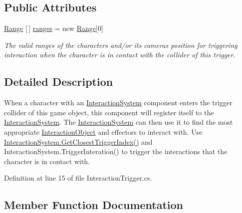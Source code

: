 \subsection*{Public Attributes}
\begin{DoxyCompactItemize}
\item 
\mbox{\hyperlink{class_root_motion_1_1_final_i_k_1_1_interaction_trigger_1_1_range}{Range}} \mbox{[}$\,$\mbox{]} \mbox{\hyperlink{class_root_motion_1_1_final_i_k_1_1_interaction_trigger_a13948fdb3d84a0bea1e15d1eb2ce019e}{ranges}} = new \mbox{\hyperlink{class_root_motion_1_1_final_i_k_1_1_interaction_trigger_1_1_range}{Range}}\mbox{[}0\mbox{]}
\begin{DoxyCompactList}\small\item\em The valid ranges of the character\textquotesingle{}s and/or it\textquotesingle{}s camera\textquotesingle{}s position for triggering interaction when the character is in contact with the collider of this trigger. \end{DoxyCompactList}\end{DoxyCompactItemize}


\subsection{Detailed Description}
When a character with an \mbox{\hyperlink{class_root_motion_1_1_final_i_k_1_1_interaction_system}{Interaction\+System}} component enters the trigger collider of this game object, this component will register itself to the \mbox{\hyperlink{class_root_motion_1_1_final_i_k_1_1_interaction_system}{Interaction\+System}}. The \mbox{\hyperlink{class_root_motion_1_1_final_i_k_1_1_interaction_system}{Interaction\+System}} can then use it to find the most appropriate \mbox{\hyperlink{class_root_motion_1_1_final_i_k_1_1_interaction_object}{Interaction\+Object}} and effectors to interact with. Use \mbox{\hyperlink{class_root_motion_1_1_final_i_k_1_1_interaction_system_a81d9ef8e0ca4a4348eae92acc5269983}{Interaction\+System.\+Get\+Closest\+Trigger\+Index()}} and Interaction\+System.\+Trigger\+Interation() to trigger the interactions that the character is in contact with. 



Definition at line 15 of file Interaction\+Trigger.\+cs.



\subsection{Member Function Documentation}
\mbox{\label{class_root_motion_1_1_final_i_k_1_1_interaction_trigger_a4ba6f97d425f444651063667def017e0}} 
